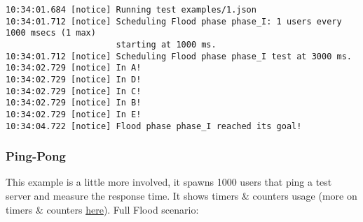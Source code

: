 \documentclass[a4paper]{article}
\begin{document}
\begin{verbatim}
10:34:01.684 [notice] Running test examples/1.json
10:34:01.712 [notice] Scheduling Flood phase phase_I: 1 users every 1000 msecs (1 max)
                      starting at 1000 ms.
10:34:01.712 [notice] Scheduling Flood phase phase_I test at 3000 ms.
10:34:02.729 [notice] In A!
10:34:02.729 [notice] In D!
10:34:02.729 [notice] In C!
10:34:02.729 [notice] In B!
10:34:02.729 [notice] In E!
10:34:04.722 [notice] Flood phase phase_I reached its goal!
\end{verbatim}
\subsubsection{Ping-Pong}
\label{sec-3-7-2}

This example is a little more involved, it spawns 1000 users that ping a test server and measure the response time. It shows timers \& counters usage (more on timers \& counters \hyperref[sec-2-2]{here}). Full Flood scenario:
\end{document}
